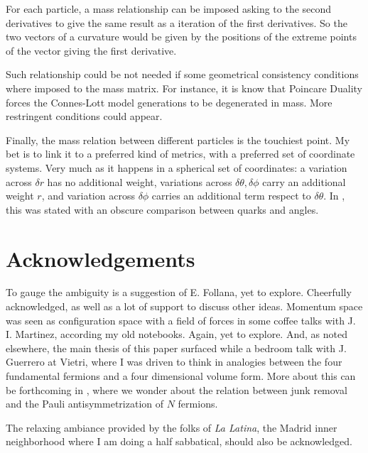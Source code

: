 \documentclass[a4paper]{article}
\begin{document}
For each particle, a mass relationship can be imposed asking to the second
derivatives to give the same result as a iteration of the first derivatives. So
the two vectors of a curvature would be given by the positions of the extreme
points of the vector giving the first  derivative.

Such relationship could be not needed if some geometrical consistency conditions
where imposed to the mass matrix. For instance, it is know that Poincare 
Duality forces the Connes-Lott model generations to be degenerated in mass.
More restringent conditions could appear.

Finally, the mass relation between different particles is the touchiest point. 
My bet is to link it to a preferred kind of metrics, with a preferred set
of coordinate systems. Very much as it happens in a spherical set of
coordinates: a variation across $\delta r$ has no additional weight, variations
across  $\delta\theta, \delta\phi$ carry an additional weight $r$, and variation across $\delta\phi$ carries an additional term respect to $\delta \theta$. 
In \cite{conjectures}, this was stated with an obscure comparison between
quarks and angles. 
 

\section{Acknowledgements}

To gauge the ambiguity is a suggestion of E. Follana, yet to explore.
 Cheerfully acknowledged, as well as a lot of support to discuss other
ideas. Momentum space was seen as configuration space
with a field of forces in some coffee talks with J. I. Martinez, 
according my old notebooks. Again, yet to explore. And, as noted elsewhere,
 the main thesis of
this paper surfaced while a bedroom talk with J. Guerrero at Vietri, where
I was driven to think in analogies between the four fundamental fermions
and a four dimensional volume form. More about this can be forthcoming
in \cite{junk}, where we wonder about the relation between junk removal
and the Pauli antisymmetrization of $N$ fermions. 

The relaxing ambiance provided by the folks of {\it La Latina}, the Madrid 
inner neighborhood where I am doing a half sabbatical,
should also be acknowledged.
\end{document}
